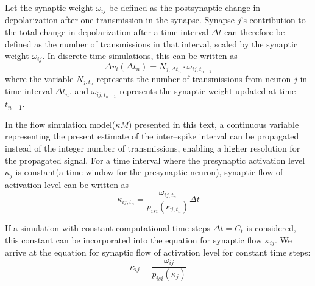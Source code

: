 	Let the synaptic weight $\omega_{ij}$ be defined as the postsynaptic change in depolarization after one transmission in the synapse.
	Synapse $j$'s contribution to the total change in depolarization after a time interval $\Delta t$ can therefore be defined as the number of transmissions in that interval, scaled by the synaptic weight $\omega_{ij}$.
	In discrete time simulations, this can be written as
	\begin{equation}
		\Delta v_{i}(\Delta t_n) = N_{j,\Delta t_n}\cdot\omega_{ij, t_{n-1}} %
	\end{equation}
	where the variable $N_{j,t_n}$ represents the number of transmissions from neuron $j$ in time interval $\Delta t_n$, and $\omega_{ij, t_{n-1}}$ represents the synaptic weight updated at time $t_{n-1}$.

	In the flow simulation model($\kappa M$) presented in this text, a continuous variable representing the present estimate of the inter--spike interval can be propagated instead of the integer number of transmissions,
		enabling a higher resolution for the propagated signal.
	For a time interval where the presynaptic activation level $\kappa_j$ is constant(a time window for the presynaptic neuron), synaptic flow of activation level can be written as
	\begin{equation}
		\kappa_{ij, t_n} = \frac{ \omega_{ij, t_n} }{ p_{isi}(\kappa_{j, t_n}) } \Delta t %
	\end{equation}

	If a simulation with constant computational time steps $\Delta t = C_t$ is considered, this constant can be incorporated into the equation for synaptic flow $\kappa_{ij}$.
	We arrive at the equation for synaptic flow of activation level for constant time steps:
	\begin{equation}
		\kappa_{ij} = \frac{ \omega_{ij} }{ p_{isi}(\kappa_{j})}
		\label{eqSynapticTransmissionForKANN}
	\end{equation}
	
